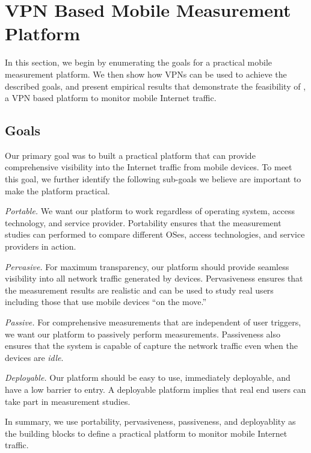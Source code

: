\section{VPN Based Mobile Measurement Platform} 
\label{sec:platform} 
In this section, we begin by enumerating the goals for a practical mobile measurement platform.
We then show how VPNs can be used to achieve the described goals, and present empirical results that demonstrate the feasibility of \platname, a VPN based platform to monitor mobile Internet traffic.

\subsection{Goals}  
\label{sec:goals} 
Our primary goal was to built a practical platform that can provide comprehensive visibility into the Internet traffic from mobile devices. 
To meet this goal, we further identify the following sub-goals we believe are important to make the platform practical.
\begin{packedenumerate}
\item \emph{Portable.} We want our platform to work regardless of operating system, access technology, and service provider. Portability ensures that the measurement studies can performed to compare different OSes, access technologies, and service providers in action.
\item \emph{Pervasive.} For maximum transparency, our platform should provide seamless visibility into all network traffic generated by devices. 
Pervasiveness ensures that the measurement results are realistic and can be used to study real users including those that use mobile devices ``on the move.''
\item \emph{Passive.} For comprehensive measurements that are independent of user triggers, we want our platform to passively perform measurements. 
Passiveness also ensures that the system is capable of capture the network traffic even when the devices are \emph{idle}.  
\item \emph{Deployable.} Our platform should be easy to use, immediately deployable, and have a low barrier to entry.
A deployable platform implies that real end users can take part in measurement studies.
\end{packedenumerate}    
In summary, we use portability, pervasiveness, passiveness, and deployablity as the building blocks to define a practical platform to monitor mobile Internet traffic.  

